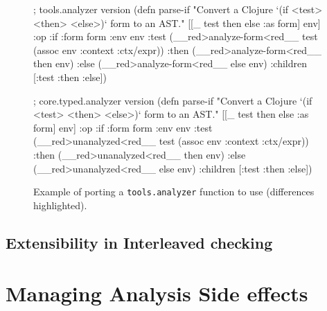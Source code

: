 \begin{figure*}
\begin{cljlisting}
; tools.analyzer version
(defn parse-if
  "Convert a Clojure `(if <test> <then> <else>)` form to an AST."
  [[_ test then else :as form] env]
  {:op      :if
   :form     form
   :env      env
   :test     (__red>analyze-form<red__ test (assoc env :context :ctx/expr))
   :then     (__red>analyze-form<red__ then env)
   :else     (__red>analyze-form<red__ else env)
   :children [:test :then :else]})

; core.typed.analyzer version
(defn parse-if
  "Convert a Clojure `(if <test> <then> <else>)` form to an AST."
  [[_ test then else :as form] env]
  {:op      :if
   :form     form
   :env      env
   :test     (__red>unanalyzed<red__ test (assoc env :context :ctx/expr))
   :then     (__red>unanalyzed<red__ then env)
   :else     (__red>unanalyzed<red__ else env)
   :children [:test :then :else]})
\end{cljlisting}

  \caption{Example of porting a \texttt{tools.analyzer} function
  to use  (differences highlighted).
  }
\end{figure*}

\section{Extensibility in Interleaved checking}

\chapter{Managing Analysis Side effects}

